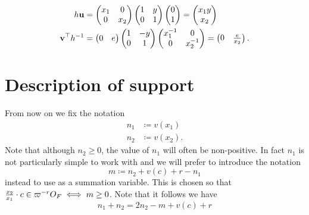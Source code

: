 \begin{align*}
  h \mathbf u &=
    \begin{pmatrix} x_1 & 0 \\ 0 & x_2 \end{pmatrix}
    \begin{pmatrix} 1 & y \\ 0 & 1 \end{pmatrix}
    \begin{pmatrix} 0 \\ 1 \end{pmatrix}
    = \begin{pmatrix} x_1 y \\ x_2 \end{pmatrix} \\
  \mathbf v^\top h^{-1} &=
    \begin{pmatrix} 0 & e \end{pmatrix}
    \begin{pmatrix} 1 & -y \\ 0 & 1 \end{pmatrix}
    \begin{pmatrix} x_1^{-1} & 0 \\ 0 & x_2^{-1} \end{pmatrix}
    = \begin{pmatrix} 0 & \frac{e}{x_2} \end{pmatrix}.
\end{align*}

\section{Description of support}
From now on we fix the notation
\begin{align*}
  n_1 &\coloneqq v(x_1) \\
  n_2 &\coloneqq v(x_2).
\end{align*}
Note that although $n_2 \ge 0$, the value of $n_1$ will often be non-positive.
In fact $n_1$ is not particularly simple to work with and we will
prefer to introduce the notation
\begin{equation}
  m \coloneqq n_2 + v(c) + r - n_1
  \label{eq:def_semi_lie_m}
\end{equation}
instead to use as a summation variable.
This is chosen so that $\frac{x_2}{x_1} \cdot c \in \varpi^{-r} O_F \iff m \ge 0$.
Note that it follows we have
\begin{equation}
  n_1 + n_2 = 2n_2 - m + v(c) + r
  \label{eq:n1_plus_n2_semi_lie}
\end{equation}


